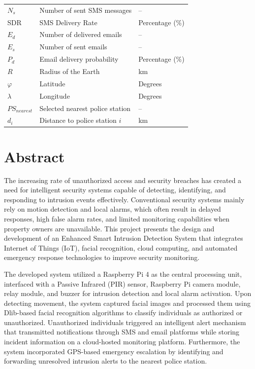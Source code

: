 \documentclass[12pt,a4paper,oneside]{report}
\begin{document}
\begin{table}[htbp]
{\begin{tabular}{|p{2.50cm}|p{8.00cm}|p{3.21cm}|}
    $N_s$         & Number of sent SMS messages                      & -- \\
    SDR           & SMS Delivery Rate                                & Percentage (\%) \\
    $E_d$         & Number of delivered emails                       & -- \\
    $E_s$         & Number of sent emails                            & -- \\
    $P_d$         & Email delivery probability                       & Percentage (\%) \\
    $R$           & Radius of the Earth                              & km \\
    $\varphi$     & Latitude                                         & Degrees \\
    $\lambda$     & Longitude                                        & Degrees \\
    $PS_{nearest}$ & Selected nearest police station                  & -- \\
    $d_i$         & Distance to police station $i$                   & km \\
    \hline
  \end{tabular}
  }
\end{table}

\clearpage
\chapter*{Abstract}

The increasing rate of unauthorized access and security breaches has created a need for intelligent security systems capable of detecting, identifying, and responding to intrusion events effectively. Conventional security systems mainly rely on motion detection and local alarms, which often result in delayed responses, high false alarm rates, and limited monitoring capabilities when property owners are unavailable. This project presents the design and development of an Enhanced Smart Intrusion Detection System that integrates Internet of Things (IoT), facial recognition, cloud computing, and automated emergency response technologies to improve security monitoring.

The developed system utilized a Raspberry Pi 4 as the central processing unit, interfaced with a Passive Infrared (PIR) sensor, Raspberry Pi camera module, relay module, and buzzer for intrusion detection and local alarm activation. Upon detecting movement, the system captured facial images and processed them using Dlib-based facial recognition algorithms to classify individuals as authorized or unauthorized. Unauthorized individuals triggered an intelligent alert mechanism that transmitted notifications through SMS and email platforms while storing incident information on a cloud-hosted monitoring platform. Furthermore, the system incorporated GPS-based emergency escalation by identifying and forwarding unresolved intrusion alerts to the nearest police station.
\end{document}

